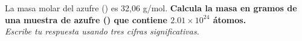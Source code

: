La masa molar del azufre () es 32,06 g/mol.
\textbf{Calcula la masa en gramos de una muestra de azufre () que contiene $2.01 \times 10^{24}$ átomos.}\\
\emph{Escribe tu respuesta usando tres cifras significativas.}
